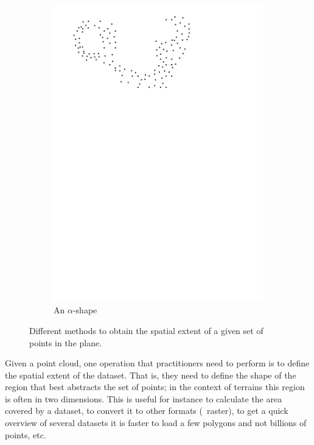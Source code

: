 \begin{figure}[h]
\begin{subfigure}[b]{0.21\linewidth}
    \includegraphics[page=4,width=\textwidth]{figs/idea.pdf}
    \caption{An $\alpha$-shape}
  \end{subfigure}
\caption{Different methods to obtain the spatial extent of a given set of points in the plane.}
\label{fig:ideas}  
\end{figure}

Given a point cloud, one operation that practitioners need to perform is to define the spatial extent of the dataset.
That is, they need to define the shape of the region that best abstracts the set of points; in the context of terrains this region is often in two dimensions.
This is useful for instance to calculate the area covered by a dataset, to convert it to other formats (\eg\ raster), to get a quick overview of several datasets it is faster to load a few polygons and not billions of points, etc.

